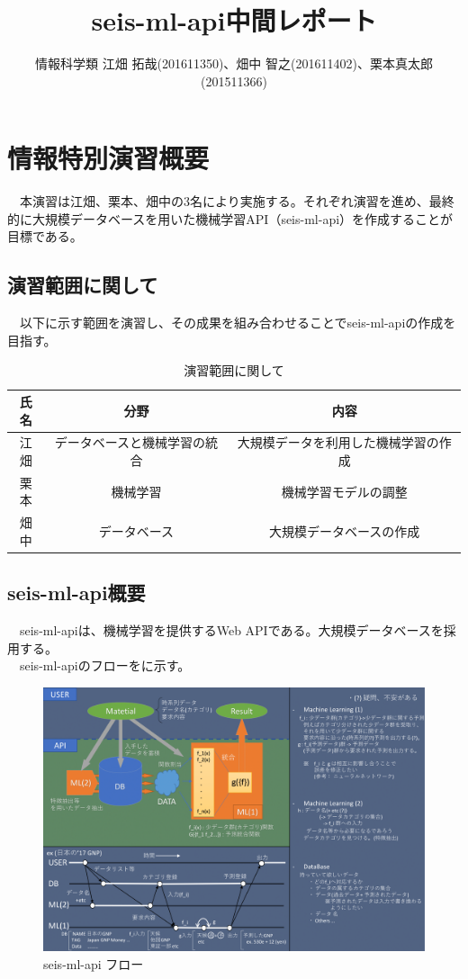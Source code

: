\documentclass{scrartcl}
\author{情報科学類 江畑 拓哉(201611350)、畑中 智之(201611402)、栗本真太郎(201511366)}
\date{}
\title{seis-ml-api中間レポート}
\begin{document}
\maketitle
\tableofcontents

\section{情報特別演習概要}
\label{sec:org9f80ab5}
　本演習は江畑、栗本、畑中の3名により実施する。それぞれ演習を進め、最終的に大規模データベースを用いた機械学習API（seis-ml-api）を作成することが目標である。\\

\subsection{演習範囲に関して}
\label{sec:org40df129}
　以下に示す範囲を演習し、その成果を組み合わせることでseis-ml-apiの作成を目指す。\\

\begin{table}[htbp]
\caption{演習範囲に関して}
\centering
\begin{tabular}{|c|c|c|}
\hline
氏名 & 分野 & 内容\\
\hline
江畑 & データベースと機械学習の統合 & 大規模データを利用した機械学習の作成\\
\hline
栗本 & 機械学習 & 機械学習モデルの調整\\
\hline
畑中 & データベース & 大規模データベースの作成\\

\hline
\end{tabular}
\end{table}

\subsection{seis-ml-api概要}
\label{sec:orgd312151}
　seis-ml-apiは、機械学習を提供するWeb APIである。大規模データベースを採用する。\\
　seis-ml-apiのフローをに示す。\\

\begin{figure}[htbp]
\centering
\includegraphics[width=15cm]{./idea-0-1.png}
\caption{seis-ml-api フロー}
\end{figure}
\end{document}
